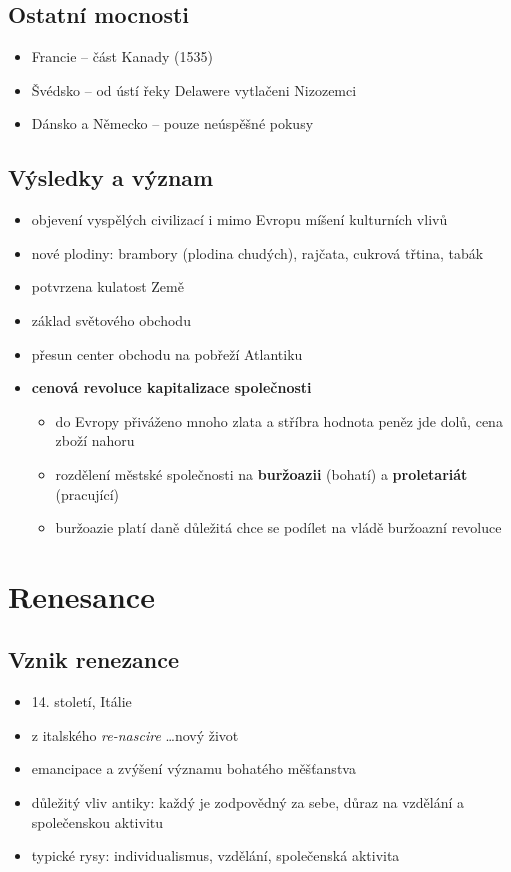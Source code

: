 \subsection{Ostatní mocnosti}
\begin{itemize}
\item Francie -- část Kanady (1535)
\item Švédsko -- od ústí řeky Delawere vytlačeni Nizozemci
\item Dánsko a Německo -- pouze neúspěšné pokusy
\end{itemize}

\subsection{Výsledky a význam}
\begin{itemize}
\item objevení vyspělých civilizací i mimo Evropu \ra míšení kulturních vlivů
\item nové plodiny: brambory (plodina chudých), rajčata, cukrová třtina, tabák
\item potvrzena kulatost Země
\item základ světového obchodu
\item přesun center obchodu na pobřeží Atlantiku
\item \textbf{cenová revoluce \ra kapitalizace společnosti}
	\begin{itemize}
	\item do Evropy přiváženo mnoho zlata a stříbra \ra hodnota peněz jde dolů, cena zboží nahoru
	\item[\ra] rozdělení městské společnosti na \textbf{buržoazii} (bohatí) a \textbf{proletariát} (pracující)
	\item buržoazie platí daně \ra důležitá \ra chce se podílet na vládě \ra buržoazní revoluce 
	\end{itemize}
\end{itemize}

\section{Renesance}
\subsection{Vznik renezance}
\begin{itemize}
\item 14. století, Itálie
\item z italského \textit{re-nascire} \ldots nový život
\item emancipace a zvýšení významu bohatého měšťanstva
\item důležitý vliv antiky: každý je zodpovědný za sebe, důraz na vzdělání a společenskou aktivitu
\item typické rysy: individualismus, vzdělání, společenská aktivita
\end{itemize}

